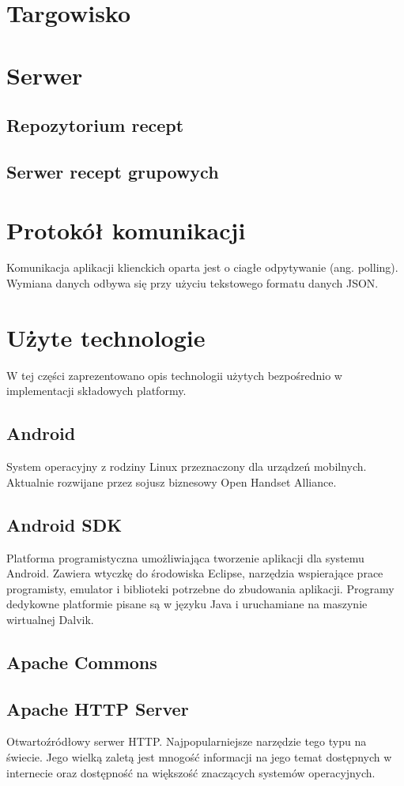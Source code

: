 \documentclass[11pt,a4paper,polish,thesis]{dcsbook}
\begin{document}
\section{Targowisko}
\section{Serwer}
\subsection{Repozytorium recept}
\subsection{Serwer recept grupowych}
\section{Protokół komunikacji}
Komunikacja aplikacji klienckich oparta jest o ciagłe odpytywanie (ang. polling). 
Wymiana danych odbywa się przy użyciu tekstowego formatu danych JSON. 






\section{Użyte technologie}
W tej części zaprezentowano opis technologii użytych bezpośrednio w implementacji składowych platformy.
\subsection{Android}
System operacyjny z rodziny Linux przeznaczony dla urządzeń mobilnych. Aktualnie rozwijane przez sojusz biznesowy Open Handset Alliance.
\subsection{Android SDK}
Platforma programistyczna umożliwiająca tworzenie aplikacji dla systemu Android. Zawiera wtyczkę do środowiska Eclipse, narzędzia wspierające prace programisty, emulator i biblioteki potrzebne do zbudowania aplikacji. Programy dedykowne platformie pisane są w języku Java i uruchamiane na maszynie wirtualnej Dalvik.
\subsection{Apache Commons}
\subsection{Apache HTTP Server}
Otwartoźródłowy serwer HTTP. Najpopularniejsze narzędzie tego typu na świecie. Jego wielką zaletą jest mnogość informacji na jego temat dostępnych w internecie oraz
dostępność na większość znaczących systemów operacyjnych.
\end{document}
